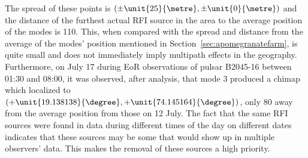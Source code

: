 \documentclass[a4paper,12pt]{article}
\begin{document}
                                                                                                                                                                                                                                                                                                                                                                                                                                                                                                                                                                                                                                                                                                                                                                                                                                                                                                                                        The spread of these points is $(\pm\unit{25}{\metre},\pm\unit{0}{\metre})$ and the distance of the furthest actual RFI source in the area to the average position of the modes is \unit{110}{\metre}. This, when compared with the spread and distance from the average of the  modes' position mentioned in Section~\ref{sec:apomegranatefarm}, is quite small and does not immediately imply multipath effects in the geography.
                                                                                                                                                                                                                                                                                                                                                                                                                                                                                                                                                                                                                                                                                                                                                                                                                                                                                                                                                                      Furthermore, on July 17 during EoR observations of pulsar B2045-16 between 01:30 and 08:00, it was observed, after analysis, that mode $3$ produced a chimap which localized to $(+\unit{19.138138}{\degree},+\unit{74.145164}{\degree})$, only \unit{80}{\metre} away from the average position from those on 12 July. The fact that the same RFI sources were found in data during different times of the day on different dates indicates that these sources may be some that would show up in multiple observers' data. This makes the removal of these sources a high priority.
\end{document}
